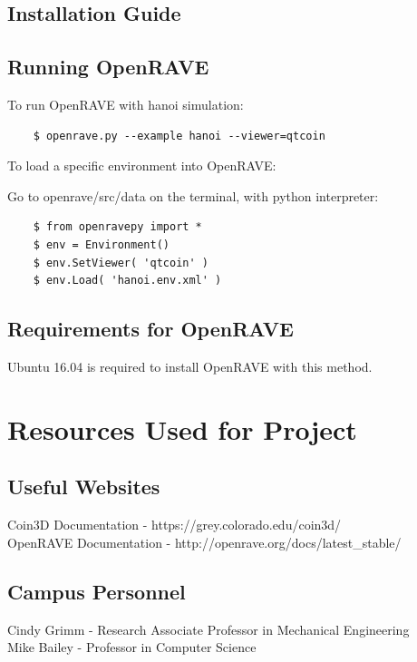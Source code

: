 \documentclass[10pt,journal,compsoc,draftclsnofoot]{IEEEtran}
\begin{document}
\begin{flushleft}
\newpage

\subsection{Installation Guide}


\newpage

\subsection{Running OpenRAVE}

To run OpenRAVE with hanoi simulation:

\begin{lstlisting}
    $ openrave.py --example hanoi --viewer=qtcoin
\end{lstlisting}

To load a specific environment into OpenRAVE:

Go to openrave/src/data on the terminal, with python interpreter:
\begin{lstlisting}
    $ from openravepy import *
    $ env = Environment()
    $ env.SetViewer( 'qtcoin' )	
    $ env.Load( 'hanoi.env.xml' )
\end{lstlisting}

\subsection{Requirements for OpenRAVE}
Ubuntu 16.04 is required to install OpenRAVE with this method.

\newpage

\section{Resources Used for Project}
\subsection{Useful Websites}
Coin3D Documentation - https://grey.colorado.edu/coin3d/ \\
OpenRAVE Documentation - http://openrave.org/docs/latest\_stable/

\subsection{Campus Personnel}
Cindy Grimm - Research Associate Professor in Mechanical Engineering \\ 
Mike Bailey - Professor in Computer Science


\end{flushleft}
\end{document}
